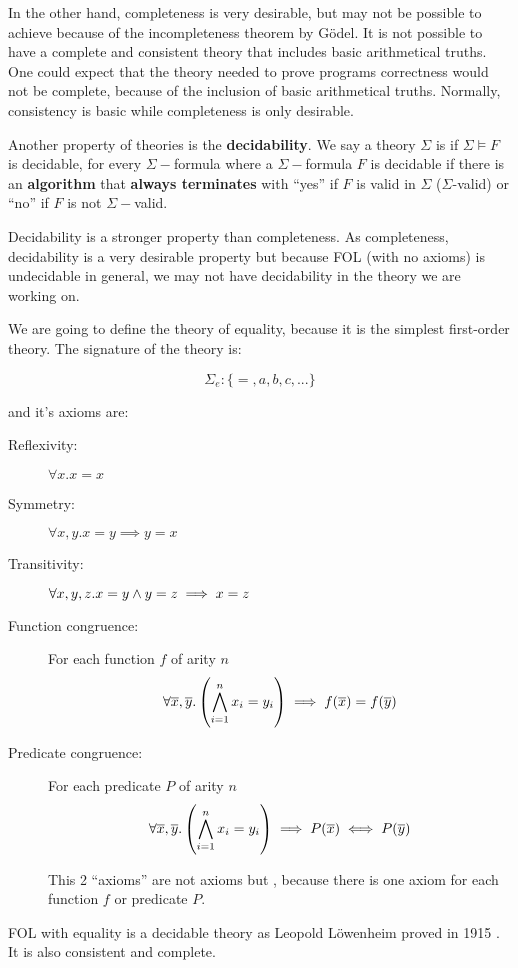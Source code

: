 \label{intr:consistency}
In the other hand, completeness is very desirable, but may not be possible to achieve because of the incompleteness theorem by Gödel.
%
It is not possible to have a complete and consistent theory that includes basic arithmetical truths. 
%
One could expect that the theory needed to prove programs correctness would not be complete, because of the inclusion of basic arithmetical truths. 
%
Normally, consistency is basic while completeness is only desirable.

Another property of theories is the \textbf{decidability}. 
%
We say a theory $\Sigma$ is  if $\Sigma \vDash F$ is decidable, for every $\Sigma-$formula 
where a $\Sigma-$formula $F$ is decidable if there is an \textbf{algorithm} that \textbf{always terminates} with ``yes'' if $F$ is valid in $\Sigma$ ($\Sigma$-valid) or ``no'' if $F$ is not $\Sigma-$valid.


Decidability is a stronger property than completeness. 
%
As completeness, decidability is a very desirable property but because \gls{FOL} (with no axioms) is undecidable in general, we may not have decidability in the theory we are working on.



\begin{example}

\label{theory:equality}

We are going to define the theory of equality, because it is the simplest first-order theory.
%
The signature of the theory is:

\[\Sigma_e:\{=,a,b,c,...\}\]

and it's axioms are:

\begin{description}
	\item[Reflexivity:	] $\forall x. x=x$
	\item[Symmetry:	] $\forall x,y. x=y \implies y=x$
	\item[Transitivity:	] $\forall x,y,z. x=y \wedge y=z \implies x=z$
	\item[Function congruence:] For each function $f$ of arity $n$
	\[\forall \overline{x},\overline{y}. \left( \bigwedge_{i=1}^n x_i = y_i \right) \implies f(\overline{x}) = f(\overline{y})\]
	\item[Predicate congruence:]  For each predicate $P$ of arity $n$
	\[\forall \overline{x},\overline{y}. \left( \bigwedge_{i=1}^n x_i = y_i \right) \implies P(\overline{x}) \iff P(\overline{y})\]

	This 2 ``axioms'' are not axioms but , because there is one axiom for each function $f$ or predicate $P$.
\end{description}

\gls{FOL} with equality is a decidable theory as Leopold Löwenheim proved in 1915 \cite{EqualityIsDecidable}. 
%
It is also consistent and complete.
\end{example}


